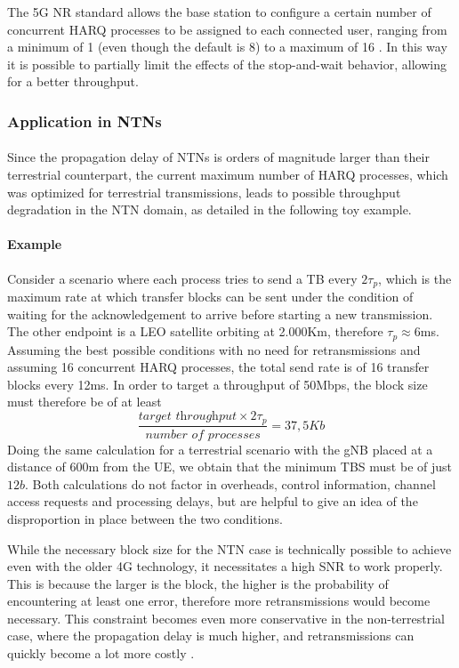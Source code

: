 The 5G \ac{NR} standard allows the base station to configure a certain number of concurrent \ac{HARQ} processes to be assigned to each connected user, ranging from a minimum of 1 (even though the default is 8) to a maximum of 16 \cite{3gpp-ts-38.300, 5g-nr-harq-devopedia}. In this way it is possible to partially limit the effects of the stop-and-wait behavior, allowing for a better throughput.

\subsubsection{Application in NTNs}
\paragraph{}
Since the propagation delay of \ac{NTNs} is orders of magnitude larger than their terrestrial counterpart, the current maximum number of \ac{HARQ} processes, which was optimized for terrestrial transmissions, leads to possible throughput degradation in the NTN domain, as detailed in the following toy example.

\paragraph{Example} Consider a scenario where each process tries to send a \ac{TB} every $2\tau_p$, which is the maximum rate at which transfer blocks can be sent under the condition of waiting for the acknowledgement to arrive before starting a new transmission. The other endpoint is a \ac{LEO} satellite orbiting at 2.000Km, therefore $\tau_p\approx6$ms. Assuming the best possible conditions with no need for retransmissions and assuming 16 concurrent \ac{HARQ} processes, the total send rate is of 16 transfer blocks every 12ms. In order to target a throughput of 50Mbps, the block size must therefore be of at least $$\frac{\textit{target throughput} \times 2\tau_p}{\textit{number of processes}} = 37,5Kb$$
Doing the same calculation for a terrestrial scenario with the \ac{gNB} placed at a distance of 600m from the \ac{UE}, we obtain that the minimum \ac{TBS} must be of just $12b$.
Both calculations do not factor in overheads, control information, channel access requests and processing delays, but are helpful to give an idea of the disproportion in place between the two conditions.

While the necessary block size for the \ac{NTN} case is technically possible to achieve even with the older 4G technology, it necessitates a high \ac{SNR} to work properly. This is because the larger is the block, the higher is the probability of encountering at least one error, therefore more retransmissions would become necessary. This constraint becomes even more conservative in the non-terrestrial case, where the propagation delay is much higher, and retransmissions can quickly become a lot more costly \cite{4g-phy-processing-sharetechnote}.

